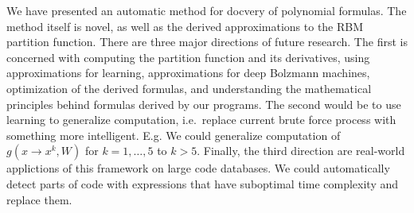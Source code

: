 We have presented an automatic method for docvery of polynomial
formulas. The method itself is novel, as well as the derived
approximations to the RBM partition function.  There are three
major directions of future research. The first is concerned with computing
the partition function and its derivatives, using approximations for
learning, approximations for deep Bolzmann machines, optimization of
the derived formulas, and understanding the mathematical principles behind
formulas derived by our programs. The second would be to use learning to
generalize computation, i.e.~replace current brute force process with
something more intelligent. E.g. We could generalize computation of
$g(x \rightarrow x^k, W)$ for $k = 1, \dots, 5$ to $k > 5$. Finally,
the third direction are real-world applictions of this framework on
large code databases. We could automatically detect parts of code with
expressions that have suboptimal time complexity and replace them.

